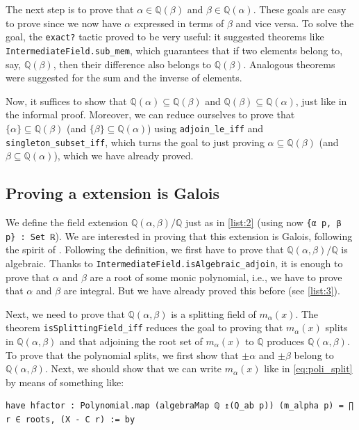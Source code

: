 \documentclass[a4paper,11pt]{article}
\theoremstyle{plain}
\newcommand{\Q}{\ensuremath{\mathbb{Q}}} %
\begin{document}
	The next step is to prove that $\alpha\in\Q(\beta)$ and $\beta\in\Q(\alpha)$. These goals are easy to prove since we now have $\alpha$ expressed in terms of $\beta$ and vice versa. To solve the goal, the \lstinline|exact?| tactic proved to be very useful: it suggested theorems like \lstinline|IntermediateField.sub_mem|, which guarantees that if two elements belong to, say, $\Q(\beta)$, then their difference also belongs to $\Q(\beta)$. Analogous theorems were suggested for the sum and the inverse of elements. 
	
	Now, it suffices to show that $\Q(\alpha)\subseteq \Q(\beta)$ and $\Q(\beta)\subseteq \Q(\alpha)$, just like in the informal proof. Moreover, we can reduce ourselves to prove that $\{\alpha\}\subseteq \Q(\beta)$ (and $\{\beta\}\subseteq \Q(\alpha)$) using \lstinline|adjoin_le_iff| and \lstinline|singleton_subset_iff|, which turns the goal to just proving $\alpha\subseteq \Q(\beta)$ (and $\beta\subseteq \Q(\alpha)$), which we have already proved.
	
	\subsection{Proving a extension is Galois}\label{sec:Galois}
	
	We define the field extension $\Q(\alpha,\beta)/\Q$ just as in \cref{list:2} (using now \lstinline|{α p, β p} : Set ℝ|). We are interested in proving that this extension is Galois, following the spirit of . Following the definition, we first have to prove that $\Q(\alpha,\beta)/\Q$ is algebraic. Thanks to \lstinline|IntermediateField.isAlgebraic_adjoin|, it is enough to prove that $\alpha$ and $\beta$ are a root of some monic polynomial, i.e., we have to prove that $\alpha$ and $\beta$ are integral. But we have already proved this before (see \cref{list:3}).
	
	Next, we need to prove that $\Q(\alpha,\beta)$ is a splitting field of $m_\alpha(x)$. The theorem \lstinline|isSplittingField_iff| reduces the goal to proving that $m_\alpha(x)$ splits in $\Q(\alpha,\beta)$ and that adjoining the root set of $m_\alpha(x)$ to $\Q$ produces $\Q(\alpha,\beta)$. To prove that the polynomial splits, we first show that $\pm\alpha$ and $\pm\beta$ belong to $\Q(\alpha,\beta)$. Next, we should show that we can write $m_\alpha(x)$ like in \cref{eq:poli_split} by means of something like:\\
	
	\begin{lstlisting}[caption={Proving that $m_\alpha(x)$ splits in $\Q(\alpha,\beta)$.}, label={list:4}]
		have hfactor : Polynomial.map (algebraMap ℚ ↥(Q_ab p)) (m_alpha p) = ∏ r ∈ roots, (X - C r) := by
	\end{lstlisting}
	
\end{document}
